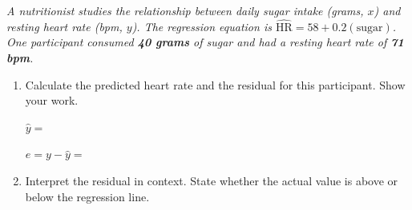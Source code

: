\documentclass[10pt]{article}
\begin{document}
\namedateperiod

\vspace{0.18in}

\begin{tcolorbox}[colback=sky, colframe=navy, boxrule=0.9pt, arc=2mm,
    left=4mm, right=4mm, top=2.5mm, bottom=2.5mm]
\small\textit{A nutritionist studies the relationship between daily sugar intake (grams, $x$) and
resting heart rate (bpm, $y$). The regression equation is
$\widehat{\text{HR}} = 58 + 0.2(\text{sugar})$.
One participant consumed \textbf{40 grams} of sugar and had a resting heart rate of \textbf{71 bpm}.}
\end{tcolorbox}

\vspace{0.16in}

\begin{enumerate}[leftmargin=1.6em, itemsep=0.2in]

  \item Calculate the predicted heart rate and the residual for this participant. Show your work.

        \vspace{6pt}
        $\hat{y} = $ 

        \vspace{6pt}
        $e = y - \hat{y} = $ 

  \item Interpret the residual in context. State whether the actual value is above or below
        the regression line.\\[8pt]

\end{enumerate}

\vspace{0.16in}
\end{document}
